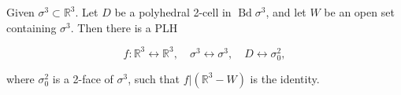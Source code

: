 Given $\sigma^3 \subset \mathbb{R}^3$. Let $D$ be a polyhedral 2-cell in $\operatorname{Bd} \sigma^3$, and let $W$ be an open set containing $\sigma^3$. Then there is a PLH

$$f: \mathbb{R}^3 \leftrightarrow \mathbb{R}^3, \quad \sigma^3 \leftrightarrow \sigma^3, \quad D \leftrightarrow \sigma^2_0,$$

where $\sigma^2_0$ is a 2-face of $\sigma^3$, such that $f|(\mathbb{R}^3 - W)$ is the identity.
